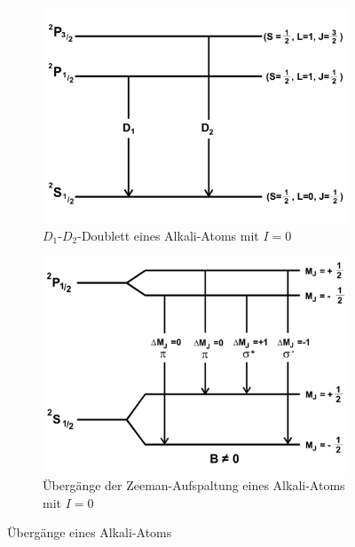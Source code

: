 \begin{figure}[h!]
 \centering
 \begin{subfigure}{0.48\textwidth}
  \centering
  \includegraphics[width=\textwidth]{doublett.pdf}
  \caption{$D_{1}$-$D_{2}$-Doublett eines Alkali-Atoms mit $I=0$}
  \label{fig:doublett}
 \end{subfigure}
 \begin{subfigure}{0.48\textwidth}
  \centering
  \includegraphics[width=\textwidth]{sigmaplus.pdf}
  \caption{Übergänge der Zeeman-Aufspaltung eines Alkali-Atoms mit $I=0$}
  \label{fig:sigmaplus}
 \end{subfigure}
 \caption{Übergänge eines Alkali-Atoms}
 \label{fig:übergänge}
\end{figure}
%
